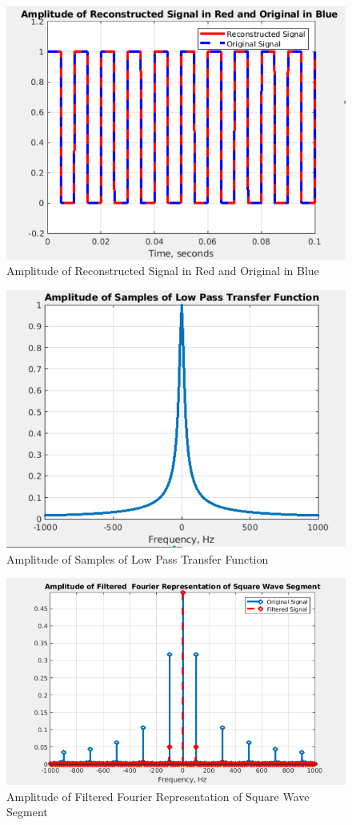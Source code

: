 \documentclass[
	letterpaper, %
	10pt, %
]{CSUniSchoolLabReport}
\begin{document}
\begin{figure}[h!]
  \centering
  \includegraphics[width=.9\textwidth]{Figures/L13Q1-6.png}
  \caption{Amplitude of Reconstructed Signal in Red and Original in Blue}
  \label{fig:6}
\end{figure}

\begin{figure}[h!]
  \centering
  \includegraphics[width=.9\textwidth]{Figures/L13Q1-7.png}
  \caption{Amplitude of Samples of Low Pass Transfer Function}
  \label{fig:7}
\end{figure}

\begin{figure}[h!]
  \centering
  \includegraphics[width=.9\textwidth]{Figures/L13Q1-8.png}
  \caption{Amplitude of Filtered Fourier Representation of Square Wave Segment}
  \label{fig:8}
\end{figure}
\end{document}

